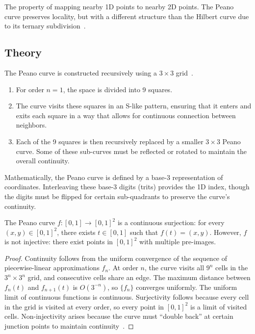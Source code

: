 \begin{definition}\label{def:peano_locality}
The property of mapping nearby 1D points to nearby 2D points. The Peano curve preserves locality, but with a different structure than the Hilbert curve due to its ternary subdivision~\cite{sagan1994}.
\end{definition}

\subsection{Theory}
The Peano curve is constructed recursively using a $3 \times 3$ grid~\cite{sagan1994}.
\begin{enumerate}
    \item For order $n=1$, the space is divided into 9 squares.
    \item The curve visits these squares in an S-like pattern, ensuring that it enters and exits each square in a way that allows for continuous connection between neighbors.
    \item Each of the 9 squares is then recursively replaced by a smaller $3 \times 3$ Peano curve. Some of these sub-curves must be reflected or rotated to maintain the overall continuity.
\end{enumerate}

Mathematically, the Peano curve is defined by a base-3 representation of coordinates. Interleaving these base-3 digits (trits) provides the 1D index, though the digits must be flipped for certain sub-quadrants to preserve the curve's continuity.

\begin{theorem}\label{thm:peano_surjective}
The Peano curve $f \colon [0,1] \to [0,1]^2$ is a continuous surjection: for every $(x, y) \in [0,1]^2$, there exists $t \in [0,1]$ such that $f(t) = (x, y)$. However, $f$ is not injective: there exist points in $[0,1]^2$ with multiple pre-images.
\end{theorem}

\begin{proof}
Continuity follows from the uniform convergence of the sequence of piecewise-linear approximations $f_n$. At order $n$, the curve visits all $9^n$ cells in the $3^n \times 3^n$ grid, and consecutive cells share an edge. The maximum distance between $f_n(t)$ and $f_{n+1}(t)$ is $O(3^{-n})$, so $\{f_n\}$ converges uniformly. The uniform limit of continuous functions is continuous. Surjectivity follows because every cell in the grid is visited at every order, so every point in $[0,1]^2$ is a limit of visited cells. Non-injectivity arises because the curve must ``double back'' at certain junction points to maintain continuity~\cite{peano1890,sagan1994}.
\end{proof}

